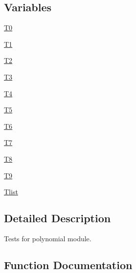 \subsection*{Variables}
\begin{DoxyCompactItemize}
\item 
\hyperlink{namespacenumpy_1_1polynomial_1_1tests_1_1test__polynomial_a8171e42a0c79fa5d6c666f97930e508d}{T0}
\item 
\hyperlink{namespacenumpy_1_1polynomial_1_1tests_1_1test__polynomial_a92b3574c9b8feb4292544ad4ce8895ab}{T1}
\item 
\hyperlink{namespacenumpy_1_1polynomial_1_1tests_1_1test__polynomial_a9cc93cbebbd25e851dd84e6c73cd18c5}{T2}
\item 
\hyperlink{namespacenumpy_1_1polynomial_1_1tests_1_1test__polynomial_a5dab397419a0e1b276965b30ea1aa9ca}{T3}
\item 
\hyperlink{namespacenumpy_1_1polynomial_1_1tests_1_1test__polynomial_ab28cbd76dc04452806843208a6814501}{T4}
\item 
\hyperlink{namespacenumpy_1_1polynomial_1_1tests_1_1test__polynomial_a3d393ad654355a4fbbb60f1f360bda93}{T5}
\item 
\hyperlink{namespacenumpy_1_1polynomial_1_1tests_1_1test__polynomial_ae1cf24c432a67b4347ef6f2681175e23}{T6}
\item 
\hyperlink{namespacenumpy_1_1polynomial_1_1tests_1_1test__polynomial_a9786cb4ee2de8eb8a55e59f37dead9f5}{T7}
\item 
\hyperlink{namespacenumpy_1_1polynomial_1_1tests_1_1test__polynomial_a2e3f37adce112dd0ee873a5441dd3aed}{T8}
\item 
\hyperlink{namespacenumpy_1_1polynomial_1_1tests_1_1test__polynomial_a5ac6c1802c8b1903b0d1f7a2cdea591a}{T9}
\item 
\hyperlink{namespacenumpy_1_1polynomial_1_1tests_1_1test__polynomial_aa05111c19648f23b7f3c2122a44c17c7}{Tlist}
\end{DoxyCompactItemize}


\subsection{Detailed Description}
\begin{DoxyVerb}Tests for polynomial module.\end{DoxyVerb}
 

\subsection{Function Documentation}
\mbox{\label{namespacenumpy_1_1polynomial_1_1tests_1_1test__polynomial_a9672ff7bc87d59de5222454a5d4d7faf}} 
